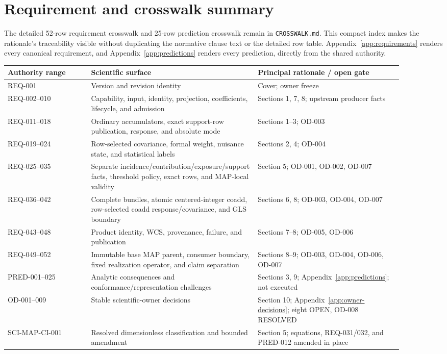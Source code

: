 \documentclass[10pt]{article}
\newcommand{\code}[1]{\nolinkurl{#1}}
\begin{document}


\clearpage
\section{Requirement and crosswalk summary}\label{app:traceability-summary}

The detailed 52-row requirement crosswalk and 25-row prediction crosswalk
remain in \code{CROSSWALK.md}. This compact index makes the rationale's
traceability visible without duplicating the normative clause text or the
detailed row table. Appendix~\ref{app:requirements} renders every canonical
requirement, and Appendix~\ref{app:predictions} renders every prediction,
directly from the shared authority.

\begin{longtable}{L{0.19\linewidth}L{0.38\linewidth}L{0.33\linewidth}}
\toprule
Authority range & Scientific surface & Principal rationale / open gate\\
\midrule
REQ-001 & Version and revision identity & Cover; owner freeze\\
REQ-002--010 & Capability, input, identity, projection, coefficients, lifecycle,
and admission & Sections 1, 7, 8; upstream producer facts\\
REQ-011--018 & Ordinary accumulators, exact support-row publication, response,
and absolute mode & Sections 1--3; OD-003\\
REQ-019--024 & Row-selected covariance, formal weight, nuisance state, and
statistical labels & Sections 2, 4; OD-004\\
REQ-025--035 & Separate incidence/contribution/exposure/support facts,
threshold policy, exact rows, and MAP-local validity & Section 5; OD-001,
OD-002, OD-007\\
REQ-036--042 & Complete bundles, atomic centered-integer coadd, row-selected
coadd response/covariance, and GLS boundary & Sections 6, 8; OD-003, OD-004,
OD-007\\
REQ-043--048 & Product identity, WCS, provenance, failure, and publication &
Sections 7--8; OD-005, OD-006\\
REQ-049--052 & Immutable base MAP parent, consumer boundary, fixed realization
operator, and claim separation & Sections 8--9; OD-003, OD-004, OD-006,
OD-007\\
PRED-001--025 & Analytic consequences and conformance/representation challenges
& Sections 3, 9; Appendix~\ref{app:predictions}; not executed\\
OD-001--009 & Stable scientific-owner decisions & Section 10;
Appendix~\ref{app:owner-decisions}; eight OPEN, OD-008 RESOLVED\\
SCI-MAP-CI-001 & Resolved dimensionless classification and bounded amendment &
Section 5; equations, REQ-031/032, and PRED-012 amended in place\\
\bottomrule
\end{longtable}
\end{document}
